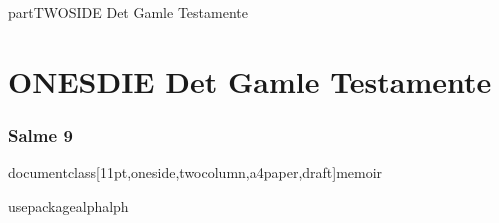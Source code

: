 \makeatletter
\if@twoside
part{TWOSIDE Det Gamle Testamente}
\else
\part{ONESDIE Det Gamle Testamente}
\fi
\makeatother

\section[Salme 9]{Salme 9}


documentclass[11pt,oneside,twocolumn,a4paper,draft]{memoir}


usepackage{alphalph}
\renewcommand{\thepagenote}{\alphalph{\value{pagenote}}}

